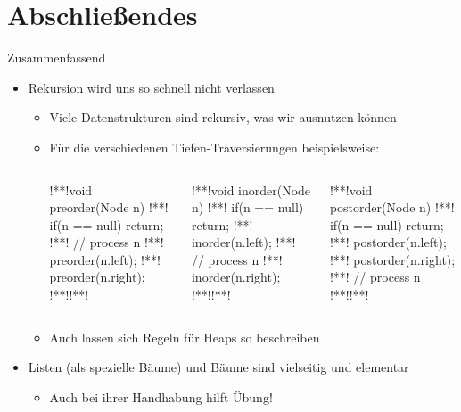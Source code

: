 \section{Abschließendes}
{\SummaryFrame
\begin{frame}[fragile,t]{Zusammenfassend}
\pause \printBibCommand
{}
\vfill\vfill %
\begin{itemize}[<+(1)->]
    \itemsep8pt
    \item Rekursion wird uns so schnell nicht verlassen \begin{itemize}
        \item Viele Datenstrukturen sind rekursiv, was wir ausnutzen können
        \item Für die verschiedenen Tiefen-Traversierungen beispielsweise:
\begin{columns}[onlytextwidth,c]
\begin{plainjava}
!**!void preorder(Node n) {
!**!    if(n == null) return;
!**!    // process n
!**!    preorder(n.left);
!**!    preorder(n.right);
!**!}!**!
\end{plainjava}
\begin{plainjava}
!**!void inorder(Node n) {
!**!    if(n == null) return;
!**!    inorder(n.left);
!**!    // process n
!**!    inorder(n.right);
!**!}!**!
\end{plainjava}
\begin{plainjava}
!**!void postorder(Node n) {
!**!    if(n == null) return;
!**!    postorder(n.left);
!**!    postorder(n.right);
!**!    // process n
!**!}!**!
\end{plainjava}
\end{columns}
    \item Auch lassen sich Regeln für Heaps so beschreiben
    \end{itemize}
    \item Listen (als spezielle Bäume) und Bäume sind vielseitig und elementar \begin{itemize}
        \item Auch bei ihrer Handhabung hilft Übung!
    \end{itemize}
\end{itemize}
\end{frame}
}

